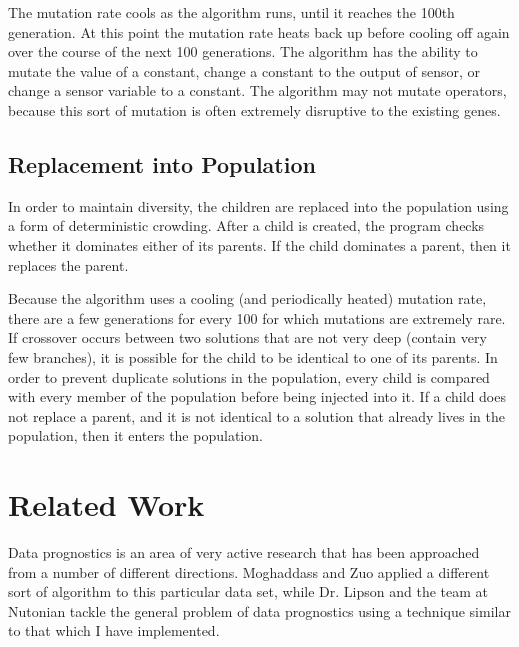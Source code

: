 \documentclass{acm_proc_article-sp}
\begin{document}
The mutation rate cools as the algorithm runs, until it reaches the 100th generation. At this point the mutation rate heats back up before cooling off again over the course of the next 100 generations. The algorithm has the ability to mutate the value of a constant, change a constant to the output of sensor, or change a sensor variable to a constant. The algorithm may not mutate operators, because this sort of mutation is often extremely disruptive to the existing genes.

\subsection{Replacement into Population}
In order to maintain diversity, the children are replaced into the population using a form of deterministic crowding. After a child is created, the program checks whether it dominates either of its parents. If the child dominates a parent, then it replaces the parent.

Because the algorithm uses a cooling (and periodically heated) mutation rate, there are a few generations for every 100 for which mutations are extremely rare. If crossover occurs between two solutions that are not very deep (contain very few branches), it is possible for the child to be identical to one of its parents. In order to prevent duplicate solutions in the population, every child is compared with every member of the population before being injected into it. If a child does not replace a parent, and it is not identical to a solution that already lives in the population, then it enters the population.

\section{Related Work}
Data prognostics is an area of very active research that has been approached from a number of different directions. Moghaddass and Zuo applied a different sort of algorithm to this particular data set, while Dr. Lipson and the team at Nutonian tackle the general problem of data prognostics using a technique similar to that which I have implemented. \cite{Mog} \cite{nutonian}
\end{document}
